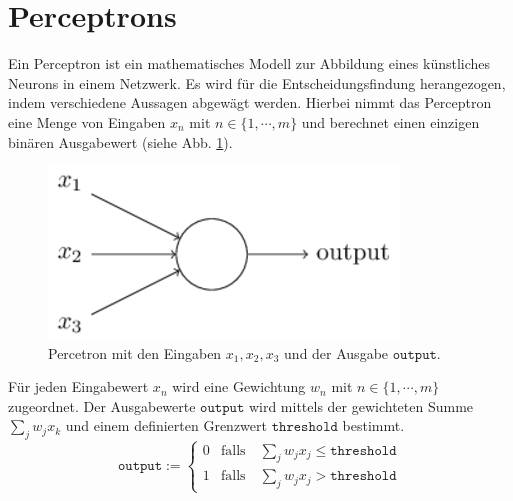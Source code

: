 \section{Perceptrons}
Ein Perceptron ist ein mathematisches Modell zur Abbildung eines künstliches Neurons in einem Netzwerk. Es wird für die Entscheidungsfindung herangezogen, indem verschiedene Aussagen abgewägt werden. Hierbei nimmt das Perceptron eine Menge von Eingaben $x_n$ mit $n \in \{1, \cdots, m\}$ und berechnet einen einzigen binären Ausgabewert (siehe Abb. \ref{fig:perceptron}). 
\begin{figure}[hbt]
	\centering
	\includegraphics[scale=0.6]{Bilder/perceptron}
	\caption{Percetron mit den Eingaben $x_1, x_2, x_3$ und der Ausgabe $\mathtt{output}$.} 
	\label{fig:perceptron} 
\end{figure}

\noindent
Für jeden Eingabewert $x_n$ wird eine Gewichtung $w_n$ mit $n \in \{1, \cdots, m\}$ zugeordnet. Der Ausgabewerte $\mathtt{output}$ wird mittels der gewichteten Summe $\sum_j w_j x_k$ und einem definierten Grenzwert $\mathtt{threshold}$ bestimmt.
\begin{equation}
	\mathtt{output} := \left\{
	\begin{array}{ll}
 		0 & \displaystyle \mbox{falls}\quad \sum\limits_j w_j x_j \leq \mathtt{threshold} \\[0.5cm]
 		1 & \displaystyle \mbox{falls}\quad \sum\limits_j w_j x_j > \mathtt{threshold}
	\end{array}\right.
\end{equation}

